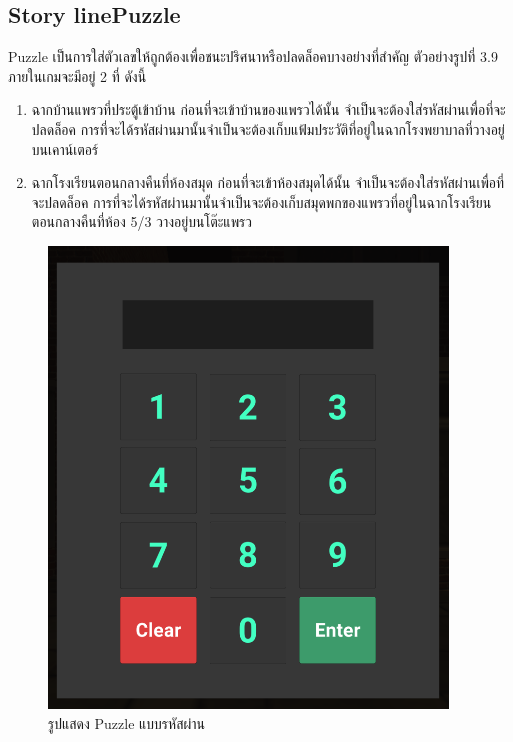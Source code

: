 \subsection{\ifenglish Story line\else Puzzle\fi }
Puzzle เป็นการใส่ตัวเลขให้ถูกต้องเพื่อชนะปริศนาหรือปลดล็อคบางอย่างที่สำคัญ ตัวอย่างรูปที่ 3.9 ภายในเกมจะมีอยู่ 2 ที่ ดังนี้
\begin{enumerate}
    \item ฉากบ้านแพรวที่ประตู้เข้าบ้าน ก่อนที่จะเข้าบ้านของแพรวได้นั้น จำเป็นจะต้องใส่รหัสผ่านเพื่อที่จะปลดล็อค การที่จะได้รหัสผ่านมานั้นจำเป็นจะต้องเก็บแฟ้มประวัติที่อยู่ในฉากโรงพยาบาลที่วางอยู่บนเคาน์เตอร์
    \item ฉากโรงเรียนตอนกลางคืนที่ห้องสมุด ก่อนที่จะเข้าห้องสมุดได้นั้น จำเป็นจะต้องใส่รหัสผ่านเพื่อที่จะปลดล็อค การที่จะได้รหัสผ่านมานั้นจำเป็นจะต้องเก็บสมุดพกของแพรวที่อยู่ในฉากโรงเรียนตอนกลางคืนที่ห้อง 5/3 วางอยู่บนโต๊ะแพรว
\end{enumerate}
\begin{figure}[h]
    \centering
    \includegraphics[scale=0.5]{Images/Password Image.png}
    \caption{รูปแสดง Puzzle แบบรหัสผ่าน}
\end{figure}



